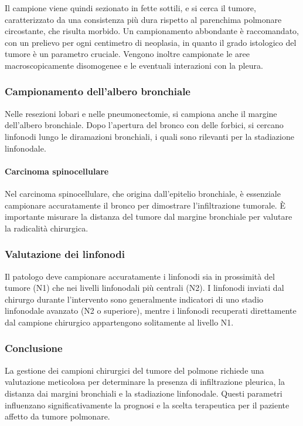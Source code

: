 Il campione viene quindi sezionato in fette sottili, e si cerca il tumore, caratterizzato da una consistenza più dura rispetto al parenchima polmonare circostante, che risulta morbido. Un campionamento abbondante è raccomandato, con un prelievo per ogni centimetro di neoplasia, in quanto il grado istologico del tumore è un parametro cruciale. Vengono inoltre campionate le aree macroscopicamente disomogenee e le eventuali interazioni con la pleura.

\subsubsection{Campionamento dell’albero bronchiale}
Nelle resezioni lobari e nelle pneumonectomie, si campiona anche il margine dell'albero bronchiale. Dopo l’apertura del bronco con delle forbici, si cercano linfonodi lungo le diramazioni bronchiali, i quali sono rilevanti per la stadiazione linfonodale.

\paragraph{Carcinoma spinocellulare}
Nel carcinoma spinocellulare, che origina dall'epitelio bronchiale, è essenziale campionare accuratamente il bronco per dimostrare l'infiltrazione tumorale. È importante misurare la distanza del tumore dal margine bronchiale per valutare la radicalità chirurgica.

\subsubsection{Valutazione dei linfonodi}
Il patologo deve campionare accuratamente i linfonodi sia in prossimità del tumore (N1) che nei livelli linfonodali più centrali (N2). I linfonodi inviati dal chirurgo durante l'intervento sono generalmente indicatori di uno stadio linfonodale avanzato (N2 o superiore), mentre i linfonodi recuperati direttamente dal campione chirurgico appartengono solitamente al livello N1.

\subsubsection{Conclusione}
La gestione dei campioni chirurgici del tumore del polmone richiede una valutazione meticolosa per determinare la presenza di infiltrazione pleurica, la distanza dai margini bronchiali e la stadiazione linfonodale. Questi parametri influenzano significativamente la prognosi e la scelta terapeutica per il paziente affetto da tumore polmonare.

